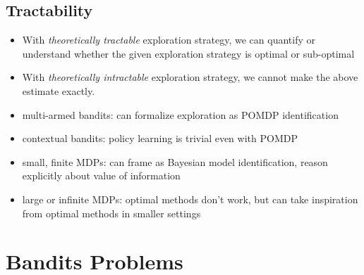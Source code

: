 
\subsection{Tractability}
\begin{itemize}
	\item With \textit{theoretically tractable} exploration strategy, we can quantify or understand whether the given exploration strategy is optimal or sub-optimal
	\item With \textit{theoretically intractable} exploration strategy, we cannot make the above estimate exactly.
\end{itemize}

\begin{center}
\end{center}

\begin{itemize}
	\item multi-armed bandits: can formalize exploration as \ac{POMDP} identification
	\item contextual bandits: policy learning is trivial even with \ac{POMDP}
	\item small, finite \ac{MDP}s: can frame as Bayesian model identification, reason explicitly about value of information
	\item large or infinite \ac{MDP}s: optimal methods don’t work, but can take inspiration from optimal methods in smaller settings
\end{itemize}

\section{Bandits Problems}
